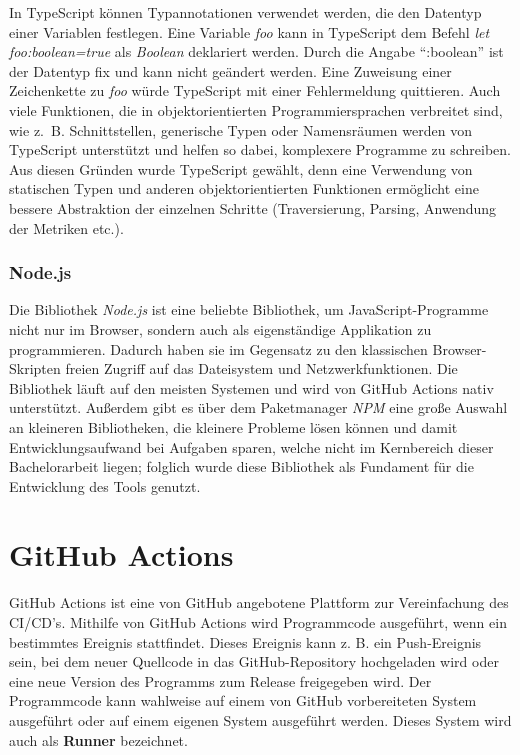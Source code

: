 In TypeScript können Typannotationen verwendet werden, die den Datentyp einer Variablen festlegen. Eine Variable \textit{foo} kann in TypeScript dem Befehl \textit{let foo:boolean=true} als \textit{Boolean} deklariert werden. Durch die Angabe \enquote{:boolean} ist der Datentyp fix und kann nicht geändert werden. Eine Zuweisung einer Zeichenkette zu \textit{foo} würde TypeScript mit einer Fehlermeldung quittieren. Auch viele Funktionen, die in objektorientierten Programmiersprachen verbreitet sind, wie z.~B. Schnittstellen, generische Typen oder Namensräumen werden von TypeScript unterstützt und helfen so dabei, komplexere Programme zu schreiben. Aus diesen Gründen wurde TypeScript gewählt, denn eine Verwendung von statischen Typen und anderen objektorientierten Funktionen ermöglicht eine bessere Abstraktion der einzelnen Schritte (Traversierung, Parsing, Anwendung der Metriken etc.). 

\subsubsection{Node.js}
Die Bibliothek  \textit{Node.js} ist eine beliebte Bibliothek, um JavaScript-Programme nicht nur im Browser, sondern auch als eigenständige Applikation zu programmieren. Dadurch haben sie im Gegensatz zu den klassischen Browser-Skripten freien Zugriff auf das Dateisystem und Netzwerkfunktionen.  Die Bibliothek läuft auf den meisten Systemen und  wird von GitHub Actions nativ unterstützt. Außerdem gibt es über dem Paketmanager \textit{NPM} eine große Auswahl an kleineren Bibliotheken, die kleinere Probleme lösen können und damit Entwicklungsaufwand bei Aufgaben sparen, welche nicht im Kernbereich dieser Bachelorarbeit liegen; folglich wurde diese Bibliothek als Fundament für die Entwicklung des Tools genutzt. 

\section{GitHub Actions}\label{chapter:github_actions}

GitHub Actions \cite{GithubActions} ist eine von GitHub angebotene Plattform zur Vereinfachung des \ac{CI/CD}'s. Mithilfe von  GitHub Actions wird Programmcode ausgeführt, wenn ein bestimmtes Ereignis stattfindet. Dieses Ereignis kann z. B. ein Push-Ereignis sein, bei dem neuer Quellcode in das GitHub-Repository hochgeladen wird oder eine neue Version des Programms zum Release freigegeben wird. Der Programmcode kann wahlweise auf einem von  GitHub vorbereiteten System ausgeführt oder auf einem eigenen System ausgeführt werden. Dieses System wird auch als \textbf{Runner} bezeichnet.

